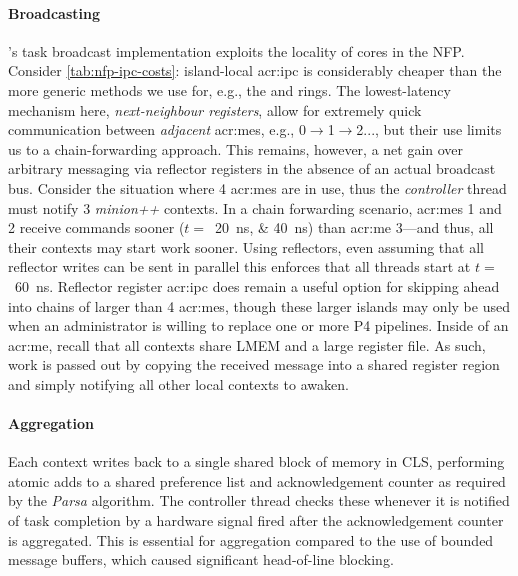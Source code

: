 
\paragraph{Broadcasting}
\approachshort{}'s task broadcast implementation exploits the locality of cores in the NFP.
Consider \cref{tab:nfp-ipc-costs}: island-local \gls{acr:ipc} is considerably cheaper than the more generic methods we use for, e.g., the \inring{} and \outring{} rings.
The lowest-latency mechanism here, \emph{next-neighbour registers}, allow for extremely quick communication between \emph{adjacent} \glspl{acr:me}, e.g., 0$\rightarrow$1$\rightarrow$2..., but their use limits us to a chain-forwarding approach.
This remains, however, a net gain over arbitrary messaging via reflector registers in the absence of an actual broadcast bus.
Consider the situation where 4 \glspl{acr:me} are in use, thus the \emph{controller} thread must notify 3 \emph{minion++} contexts.
In a chain forwarding scenario, \glspl{acr:me} 1 and 2 receive commands sooner ($t=$~\qtylist{20; 40}{\nano\second}) than \gls{acr:me} 3---and thus, all their contexts may start work sooner.
Using reflectors, even assuming that all reflector writes can be sent in parallel this enforces that all threads start at $t=$~\qty{60}{\nano\second}.
Reflector register \gls{acr:ipc} does remain a useful option for skipping ahead into chains of larger than 4 \glspl{acr:me}, though these larger islands may only be used when an administrator is willing to replace one or more P4 pipelines.
Inside of an \gls{acr:me}, recall that all contexts share LMEM and a large register file.
As such, work is passed out by copying the received message into a shared register region and simply notifying all other local contexts to awaken.

\paragraph{Aggregation}
Each context writes back to a single shared block of memory in CLS, performing atomic adds to a shared preference list and acknowledgement counter as required by the \emph{Parsa} algorithm.
The controller thread checks these whenever it is notified of task completion by a hardware signal fired after the acknowledgement counter is aggregated.
This is essential for aggregation compared to the use of bounded message buffers, which caused significant head-of-line blocking.


